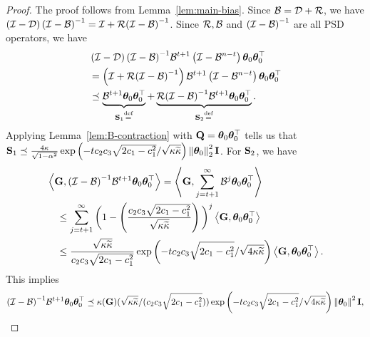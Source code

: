 \begin{proof}
	The proof follows from Lemma~\ref{lem:main-bias}. Since $\B = \D + \Rc$, we have $\left(\eyeT - \D\right) \inv{\left(\eyeT - \B \right)} = \eyeT + \Rc \inv{\left(\eyeT - \B \right)}$. Since $\Rc, \B$ and $\inv{(\eyeT - \B)}$ are all PSD operators, we have
	\begin{align*}
		&\left(\eyeT - \D\right) \inv{\left(\eyeT - \B \right)} \B^{t+1} \left(\eyeT - \B^{n-t}\right) \thetat[0]\thetat[0]\T \\
		&= \left(\eyeT + \Rc \inv{\left(\eyeT - \B \right)}\right) \B^{t+1} \left(\eyeT - \B^{n-t}\right) \thetat[0]\thetat[0]\T \\
		&\preceq \underbrace{\B^{t+1} \thetat[0]\thetat[0]\T}_{\S_1\eqdef } + \underbrace{\Rc \inv{\left(\eyeT - \B \right)} \B^{t+1} \thetat[0]\thetat[0]\T}_{\S_2\eqdef }.
	\end{align*}
	Applying Lemma~\ref{lem:B-contraction} with $\Q=\thetav_0\thetav_0\T$ tells us that $\S_1 \preceq \frac{4\cnH}{\sqrt{1-\alpha^2}} \exp\left(-t \ctwo \cthree \sqrt{2\cone - \cone^2}/\sqrt{\cnH\cnS}\right) \twonorm{\thetat[0]}^2 \Id$.
	For $\S_2$, we have
	\begin{align*}
		&\iprod{\G}{\inv{\left(\eyeT - \B \right)} \B^{t+1} \thetat[0]\thetat[0]\T} = \iprod{\G}{\sum_{j=t+1}^{\infty} \B^j \thetat[0]\thetat[0]\T} \\
		&\quad \leq \sum_{j=t+1}^{\infty} \bigg(1-\left(\frac{ \ctwo \cthree \sqrt{2\cone-\cone^2} }{\sqrt{\cnH\cnS}}\right)\bigg)^j \iprod{\G}{\thetat[0]\thetat[0]\T} \\
		&\quad \leq \frac{\sqrt{\cnH\cnS}}{\ctwo\cthree\sqrt{2\cone-\cone^2}} \exp\left(-t \ctwo \cthree \sqrt{2\cone - \cone^2}/\sqrt{4 \cnH\cnS}\right) \iprod{\G}{\thetat[0]\thetat[0]\T}.
	\end{align*}
	This implies
	\begin{align*}
	\inv{\left(\eyeT - \B \right)} \B^{t+1} \thetat[0]\thetat[0]\T \preceq  \kappa(\G) (\sqrt{\cnH\cnS}/(\ctwo\cthree\sqrt{2\cone-\cone^2}))  \exp\left(-t \ctwo \cthree \sqrt{2\cone - \cone^2}/\sqrt{4 \cnH\cnS}\right) \norm{\thetat[0]}^2 \eye,

\end{align*}
\end{proof}
